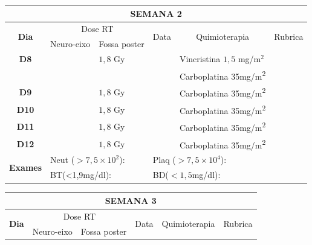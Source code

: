 \documentclass[11pt,a4paper,oldfontcommands]{memoir}
\begin{document}
\begin{center}
\begin{table}[H]
\begin{tabular}{p{1cm}p{2cm}|p{2cm}|p{1cm}|p{4cm}|p{3cm}}
	\hline
	\multicolumn{6}{c}{\textbf{SEMANA 2}}\\
\hline
    \multicolumn{1}{c|}{\multirow{2}{*}{\textbf{Dia}}}&\multicolumn{2}{c|}{Dose RT}&\multicolumn{1}{c|}{\multirow{2}{*}{Data}}&\multicolumn{1}{c|}{\multirow{2}{*}{Quimioterapia}}&\multicolumn{1}{c}{\multirow{2}{*}{Rubrica}} \\
    \cline{2-3}
    \multicolumn{1}{c|}{\multirow{1}{*}{}}&{Neuro-eixo}&{Fossa poster}&& \\
	\hline
	\multicolumn{1}{c|}{\multirow{1}{*}{\textbf{D8}}}&\multicolumn{1}{c|}{}&{\(1,8\) Gy}&&{Vincristina \(1,5\) mg/m\(^2\)}&\\
	\multicolumn{1}{c|}{\multirow{1}{*}{\textbf{}}}&\multicolumn{1}{c|}{}&&&{Carboplatina 35mg/m\textsuperscript{2}}&\\
    \multicolumn{1}{c|}{\multirow{1}{*}{\textbf{D9}}}&\multicolumn{1}{c|}{}&{\(1,8\) Gy}&&{Carboplatina 35mg/m\textsuperscript{2}}&\\
    \multicolumn{1}{c|}{\multirow{1}{*}{\textbf{D10}}}&\multicolumn{1}{c|}{}&{\(1,8\) Gy}&&{Carboplatina 35mg/m\textsuperscript{2}}&\\
    \multicolumn{1}{c|}{\multirow{1}{*}{\textbf{D11}}}&\multicolumn{1}{c|}{}&{\(1,8\) Gy}&&{Carboplatina 35mg/m\textsuperscript{2}}&\\
    \multicolumn{1}{c|}{\multirow{1}{*}{\textbf{D12}}}&\multicolumn{1}{c|}{}&{\(1,8\) Gy}&&{Carboplatina 35mg/m\textsuperscript{2}}&\\
    \hline
    \multicolumn{1}{c|}{\multirow{2}{*}{\textbf{Exames}}}&\multicolumn{2}{l|}{Neut (\(>7,5\times10^2\)):}&\multicolumn{2}{l|}{Plaq (\(>7,5\times10^4\)):}&\\
    \cline{2-6}
    \multicolumn{1}{c|}{\multirow{2}{*}{{}}}&\multicolumn{2}{l|}{BT(<1,9mg/dl):}&\multicolumn{2}{l|}{BD(\(<1,5\)mg/dl):}&\\
    \hline
\end{tabular}
\end{table}
\begin{table}[H]
\begin{tabular}{p{1cm}p{2cm}|p{2cm}|p{1cm}|p{4cm}|p{3cm}}
	\hline
	\multicolumn{6}{c}{\textbf{SEMANA 3}}\\
\hline
    \multicolumn{1}{c|}{\multirow{2}{*}{\textbf{Dia}}}&\multicolumn{2}{c|}{Dose RT}&\multicolumn{1}{c|}{\multirow{2}{*}{Data}}&\multicolumn{1}{c|}{\multirow{2}{*}{Quimioterapia}}&\multicolumn{1}{c}{\multirow{2}{*}{Rubrica}} \\
    \cline{2-3}
    \multicolumn{1}{c|}{\multirow{1}{*}{}}&{Neuro-eixo}&{Fossa poster}&& \\

\end{tabular}
\end{table}
\end{center}
\end{document}
